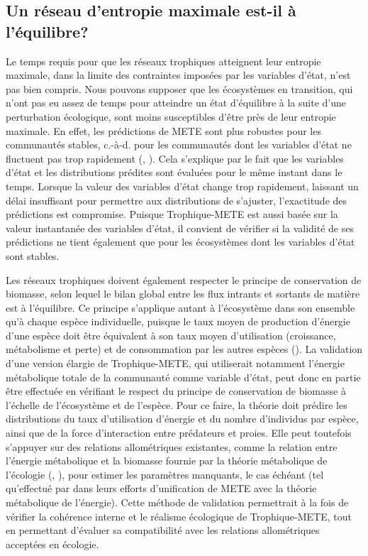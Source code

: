 \subsection{Un réseau d'entropie maximale est-il à l'équilibre?} 

Le temps requis pour que les réseaux trophiques atteignent leur entropie
maximale, dans la limite des contraintes imposées par les variables d'état,
n'est pas bien compris. Nous pouvons supposer que les écosystèmes en transition,
qui n'ont pas eu assez de temps pour atteindre un état d'équilibre à la suite
d'une perturbation écologique, sont moins susceptibles d'être près de leur
entropie maximale. En effet, les prédictions de METE sont plus robustes pour les
communautés stables, c.-à-d. pour les communautés dont les variables d'état ne
fluctuent pas trop rapidement (\cite{Newman2020Disturbance},
\cite{Harte2021Dynamete}). Cela s'explique par le fait que les variables d'état
et les distributions prédites sont évaluées pour le même instant dans le temps.
Lorsque la valeur des variables d'état change trop rapidement, laissant un délai
insuffisant pour permettre aux distributions de s'ajuster, l'exactitude des
prédictions est compromise. Puisque Trophique-METE est aussi basée sur la valeur
instantanée des variables d'état, il convient de vérifier si la validité de ses
prédictions ne tient également que pour les écosystèmes dont les variables
d'état sont stables.

Les réseaux trophiques doivent également respecter le principe de conservation
de biomasse, selon lequel le bilan global entre les flux intrants et sortants de
matière est à l'équilibre. Ce principe s'applique autant à l'écosystème dans son
ensemble qu'à chaque espèce individuelle, puisque le taux moyen de production
d'énergie d'une espèce doit être équivalent à son taux moyen d'utilisation
(croissance, métabolisme et perte) et de consommation par les autres espèces
(\cite{Sterner2002Ecological}). La validation d'une version élargie de
Trophique-METE, qui utiliserait notamment l'énergie métabolique totale de la
communauté comme variable d'état, peut donc en partie être effectuée en
vérifiant le respect du principe de conservation de biomasse à l'échelle de
l'écosystème et de l'espèce. Pour ce faire, la théorie doit prédire les
distributions du taux d'utilisation d'énergie et du nombre d'individus par
espèce, ainsi que de la force d'interaction entre prédateurs et proies. Elle
peut toutefois s'appuyer sur des relations allométriques existantes, comme la
relation entre l'énergie métabolique et la biomasse fournie par la théorie
métabolique de l'écologie (\cite{Brown2004Metabolic}, \cite{West1997General}),
pour estimer les paramètres manquants, le cas échéant (tel qu'effectué par
\cite{Harte2022Equation} dans leurs efforts d'unification de METE avec la
théorie métabolique de l'énergie). Cette méthode de validation permettrait à la
fois de vérifier la cohérence interne et le réalisme écologique de
Trophique-METE, tout en permettant d'évaluer sa compatibilité avec les relations
allométriques acceptées en écologie.



